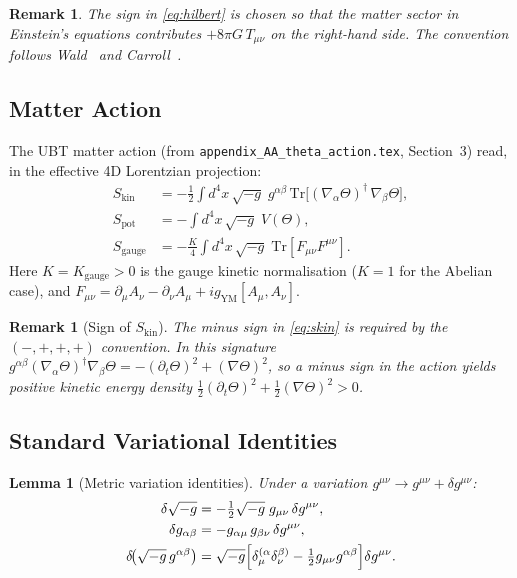 \documentclass[12pt]{article}
\newtheorem{lemma}[definition]{Lemma}
\newtheorem{remark}[definition]{Remark}
\newcommand{\Tr}{\mathrm{Tr}}
\begin{document}
\begin{remark}
  The sign in \eqref{eq:hilbert} is chosen so that the matter sector in
  Einstein's equations contributes $+8\pi G\,T_{\mu\nu}$ on the right-hand side.
  The convention follows Wald~\cite{wald} and Carroll~\cite{carroll}.
\end{remark}

\subsection{Matter Action}

The UBT matter action (from \texttt{appendix\_AA\_theta\_action.tex},
Section~3) read, in the effective 4D Lorentzian projection:
\begin{align}
  S_{\mathrm{kin}}   &= -\tfrac{1}{2}\int d^4x\,\sqrt{-g}\;
    g^{\alpha\beta}\,\Tr\!\bigl[(\nabla_\alpha\Theta)^\dagger\,
    \nabla_\beta\Theta\bigr], \label{eq:skin} \\
  S_{\mathrm{pot}}   &= -\int d^4x\,\sqrt{-g}\; V(\Theta),
    \label{eq:spot} \\
  S_{\mathrm{gauge}} &= -\frac{K}{4}\int d^4x\,\sqrt{-g}\;
    \Tr[F_{\mu\nu}F^{\mu\nu}].
    \label{eq:sgauge}
\end{align}
Here $K = K_{\mathrm{gauge}} > 0$ is the gauge kinetic normalisation
($K = 1$ for the Abelian case), and $F_{\mu\nu} = \partial_\mu A_\nu - \partial_\nu A_\mu
+ i g_{\mathrm{YM}}[A_\mu, A_\nu]$.

\begin{remark}[Sign of $S_{\mathrm{kin}}$]
  The minus sign in \eqref{eq:skin} is required by the $(-,+,+,+)$ convention.
  In this signature $g^{\alpha\beta}(\nabla_\alpha\Theta)^\dagger\nabla_\beta\Theta
  = -({\partial_t\Theta})^2 + (\nabla\Theta)^2$,
  so a minus sign in the action yields positive kinetic energy density
  $\tfrac{1}{2}(\partial_t\Theta)^2 + \tfrac{1}{2}(\nabla\Theta)^2 > 0$.
\end{remark}

\subsection{Standard Variational Identities}

\begin{lemma}[Metric variation identities]
\label{lem:var_ids}
Under a variation $g^{\mu\nu} \to g^{\mu\nu} + \delta g^{\mu\nu}$:
\begin{align}
  \delta\sqrt{-g}
    &= -\tfrac{1}{2}\sqrt{-g}\; g_{\mu\nu}\,\delta g^{\mu\nu},
    \label{eq:var_sqrtg} \\
  \delta g_{\alpha\beta}
    &= -g_{\alpha\mu}\,g_{\beta\nu}\,\delta g^{\mu\nu},
    \label{eq:var_lower} \\
  \delta\!\bigl(\sqrt{-g}\,g^{\alpha\beta}\bigr)
    &= \sqrt{-g}\Bigl[\delta^{(\alpha}_\mu\delta^{\beta)}_\nu
       -\tfrac{1}{2}g_{\mu\nu}g^{\alpha\beta}\Bigr]\delta g^{\mu\nu}.
    \label{eq:var_combined}
\end{align}
\end{lemma}
\end{document}
